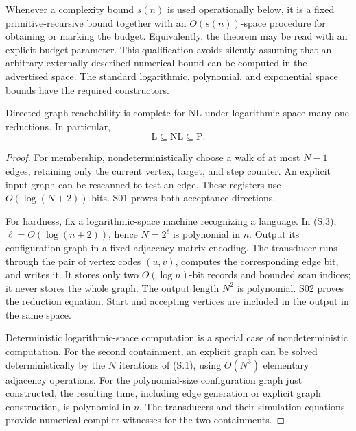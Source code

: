 Whenever a complexity bound $s(n)$ is used operationally below, it is a
fixed primitive-recursive bound together with an $O(s(n))$-space procedure
for obtaining or marking the budget.  Equivalently, the theorem may be
read with an explicit budget parameter.  This qualification avoids silently
assuming that an arbitrary externally described numerical bound can be
computed in the advertised space.  The standard logarithmic, polynomial,
and exponential space bounds have the required constructors.

\begin{theorem}
\label{thm:S03}
Directed graph reachability is complete for $\mathrm{NL}$ under
logarithmic-space many-one reductions.  In particular,
\[
 \mathrm L\subseteq\mathrm{NL}\subseteq\mathrm P.
\]
\end{theorem}
\begin{proof}
For membership, nondeterministically choose a walk of at most $N-1$
edges, retaining only the current vertex, target, and step counter.
An explicit input graph can be rescanned to test an edge.  These
registers use $O(\log(N+2))$ bits.  S01 proves both acceptance directions.

For hardness, fix a logarithmic-space machine recognizing a language.
In (S.3), $\ell=O(\log(n+2))$, hence $N=2^\ell$ is polynomial in $n$.
Output its configuration graph in a fixed adjacency-matrix encoding.
The transducer runs through the pair of vertex codes $(u,v)$, computes
the corresponding edge bit, and writes it.  It stores only two
$O(\log n)$-bit records and bounded scan indices; it never stores the
whole graph.  The output length $N^2$ is polynomial.  S02 proves the
reduction equation.  Start and accepting vertices are included in the
output in the same space.

Deterministic logarithmic-space computation is a special case of
nondeterministic computation.  For the second containment, an explicit
graph can be solved deterministically by the $N$ iterations of (S.1),
using $O(N^3)$ elementary adjacency operations.  For the polynomial-size
configuration graph just constructed, the resulting time, including
edge generation or explicit graph construction, is polynomial in $n$.
The transducers and their simulation equations provide numerical
compiler witnesses for the two containments.
\end{proof}

